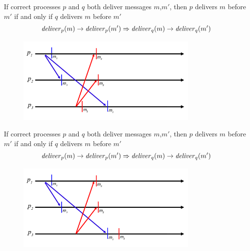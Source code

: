 \begin{frame}

\begin{definition}
If correct processes $p$ and $q$ both deliver messages $m$,$m'$, then $p$ delivers $m$ before $m'$ if and only if $q$ delivers $m$ before $m'$
\[
  \mathit{deliver}_p(m) \rightarrow \mathit{deliver}_p(m') \Rightarrow \mathit{deliver}_q(m) \rightarrow \mathit{deliver}_q(m')
\]
\end{definition}

 

\begin{figure}
\includegraphics[width=0.8\textwidth]{rb-causal1}
\end{figure}

\end{frame}

\begin{frame}

\begin{definition}
If correct processes $p$ and $q$ both deliver messages $m$,$m'$, then $p$ delivers $m$ before $m'$ if and only if $q$ delivers $m$ before $m'$
\[
  \mathit{deliver}_p(m) \rightarrow \mathit{deliver}_p(m') \Rightarrow \mathit{deliver}_q(m) \rightarrow \mathit{deliver}_q(m')
\]
\end{definition}

 

\begin{figure}
\includegraphics[width=0.8\textwidth]{rb-total}
\end{figure}

\end{frame}

